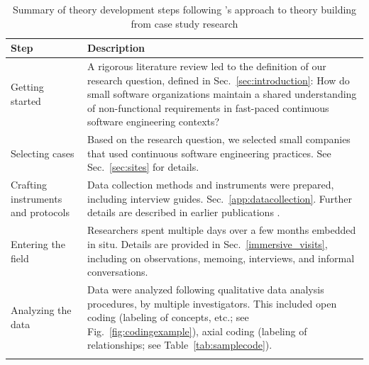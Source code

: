 \documentclass[smallextended]{svjour3}       %
\begin{document}
\begin{table}[!h]
    \centering
    \caption{Summary of theory development steps following \citet{eisenhardt1989building}'s approach to theory building from case study research}
    \label{tab:theorizing}

\begin{tabular}{P{2cm}p{9.2cm}}

\toprule 
Step & Description \\
\midrule 

Getting started & A rigorous literature review led to the definition of our research question, defined in Sec.~\ref{sec:introduction}:  How do small software organizations maintain a shared understanding of non-functional requirements in fast-paced continuous software engineering contexts? \\

\addlinespace

Selecting cases & Based on the research question, we selected small companies that used continuous software engineering practices. See Sec.~\ref{sec:sites} for details. \\

\addlinespace

Crafting instruments and protocols & Data collection methods and instruments were prepared, including interview guides. Sec.~\ref{app:datacollection}. Further details are described in earlier publications \citep{werner2020re,werner_tse_2021,okpara_re2022,okpara_rej2023}.\\

\addlinespace

Entering the field & Researchers spent multiple days over a few months embedded in situ. Details are provided in Sec.~\ref{immersive_visits}, including on observations, memoing, interviews, and informal conversations.\\


\addlinespace

Analyzing the data & Data were analyzed following qualitative data analysis procedures, by multiple investigators. This included open coding (labeling of concepts, etc.; see Fig.~\ref{fig:codingexample}), axial coding (labeling of relationships; see Table~\ref{tab:samplecode}). \\

\addlinespace


\end{tabular}
\end{table}
\end{document}
